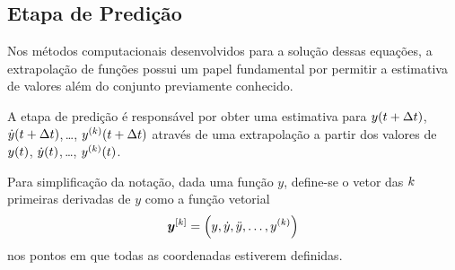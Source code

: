 \subsection{Etapa de Predição} \label{subsec:prediction}

Nos métodos computacionais desenvolvidos para a solução dessas equações, a extrapolação de funções possui um papel fundamental por permitir a estimativa de valores além do conjunto previamente conhecido.

A etapa de predição é responsável por obter uma estimativa para \(y\pqty{t+\Dt}\), \(\deriv{1}{y}\pqty{t+\Dt}\),\,\dots, \(\deriv{\taylorOrder}{y}\pqty{t+\Dt}\) através de uma extrapolação a partir dos valores de \(y\pqty{t}\), \(\deriv{1}{y}\pqty{t}\),\,\dots, \(\deriv{\taylorOrder}{y}\pqty{t}\).

Para simplificação da notação, dada uma função \(y\), define-se o vetor das \(k\) primeiras derivadas de \(y\) como a função vetorial
\begin{equation*}
	\drvec{\taylorOrder}{y} = \pqty{y, \deriv{1}{y}, \deriv{2}{y}, \dots, \deriv{\taylorOrder}{y}}
\end{equation*}
nos pontos em que todas as coordenadas estiverem definidas.

